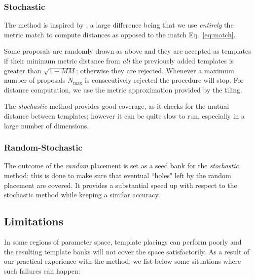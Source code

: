 \documentclass[twocolumn,showpacs,preprintnumbers,nofootinbib,prd,
superscriptaddress,10pt]{revtex4-2}
\begin{document}
\subsubsection{Stochastic}\label{par:stochastic}
The method is inspired by \cite{PhysRevD.80.104014}, a large difference being that we use {\it entirely} the metric match to compute distances as opposed to the match Eq.~\eqref{eq:match}.

Some proposals are randomly drawn as above and they are accepted as templates if their minimum metric distance from {\it all} the previously added templates is greater than  $\sqrt{1-MM}$; otherwise they are rejected.
Whenever a maximum number of proposals $N_\text{max}$ is consecutively rejected the procedure will stop. For distance computation, we use the metric approximation provided by the tiling.

The {\it stochastic} method provides good coverage, as it checks for the mutual distance between templates; however it can be quite slow to run, especially in a large number of dimensions.

\subsubsection{Random-Stochastic}\label{par:randomstochastic}
The outcome of the {\it random} placement is set as a seed bank for the {\it stochastic} method; this is done to make sure that eventual ``holes" left by the random placement are covered. It provides a substantial speed up with respect to the stochastic method while keeping a similar accuracy.

\subsection{Limitations} \label{sec:limitations}

In some regions of parameter space, template placings can perform poorly and the resulting template banks will not cover the space satisfactorily.
As a result of our practical experience with the method, we list below some situations where such failures can happen:
\end{document}
